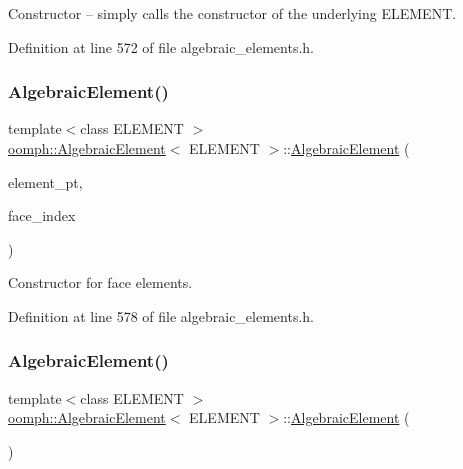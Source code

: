Constructor -- simply calls the constructor of the underlying E\+L\+E\+M\+E\+NT. 



Definition at line 572 of file algebraic\+\_\+elements.\+h.

\mbox{\label{classoomph_1_1AlgebraicElement_af4ad322eea2c6fab36c1a74c18ecd781}} 
\subsubsection{\texorpdfstring{Algebraic\+Element()}{AlgebraicElement()}\hspace{0.1cm}{\footnotesize\ttfamily [2/3]}}
{\footnotesize\ttfamily template$<$class E\+L\+E\+M\+E\+NT $>$ \\
\hyperlink{classoomph_1_1AlgebraicElement}{oomph\+::\+Algebraic\+Element}$<$ E\+L\+E\+M\+E\+NT $>$\+::\hyperlink{classoomph_1_1AlgebraicElement}{Algebraic\+Element} (\begin{DoxyParamCaption}\item[{\hyperlink{classoomph_1_1FiniteElement}{Finite\+Element} $\ast$const \&}]{element\+\_\+pt,  }\item[{const int \&}]{face\+\_\+index }\end{DoxyParamCaption})\hspace{0.3cm}{\ttfamily [inline]}}



Constructor for face elements. 



Definition at line 578 of file algebraic\+\_\+elements.\+h.

\mbox{\label{classoomph_1_1AlgebraicElement_a2a0f43e92929bc56efa19ce12613c605}} 
\subsubsection{\texorpdfstring{Algebraic\+Element()}{AlgebraicElement()}\hspace{0.1cm}{\footnotesize\ttfamily [3/3]}}
{\footnotesize\ttfamily template$<$class E\+L\+E\+M\+E\+NT $>$ \\
\hyperlink{classoomph_1_1AlgebraicElement}{oomph\+::\+Algebraic\+Element}$<$ E\+L\+E\+M\+E\+NT $>$\+::\hyperlink{classoomph_1_1AlgebraicElement}{Algebraic\+Element} (\begin{DoxyParamCaption}\item[{const \hyperlink{classoomph_1_1AlgebraicElement}{Algebraic\+Element}$<$ E\+L\+E\+M\+E\+NT $>$ \&}]{ }\end{DoxyParamCaption})\hspace{0.3cm}{\ttfamily [inline]}}



